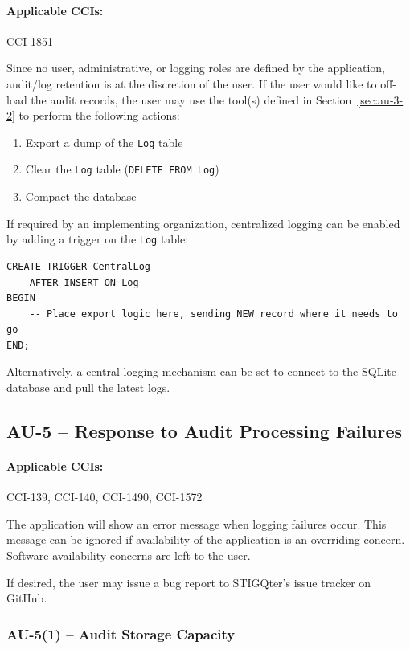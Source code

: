 \documentclass[letterpaper, 10pt, twoside]{article}
\begin{document}
\paragraph{Applicable CCIs:} CCI-1851

Since no user, administrative, or logging roles are defined by the application, audit/log retention is at the discretion of the user. If the user would like to off-load the audit records, the user may use the tool(s) defined in Section~\ref{sec:au-3-2} to perform the following actions:
\begin{enumerate}
	\item Export a dump of the \texttt{Log} table
	\item Clear the \texttt{Log} table (\texttt{DELETE FROM Log})
	\item Compact the database
\end{enumerate}

If required by an implementing organization, centralized logging can be enabled by adding a trigger on the \texttt{Log} table:

\begin{lstlisting}[style=SqlStyle]
CREATE TRIGGER CentralLog 
	AFTER INSERT ON Log
BEGIN
	-- Place export logic here, sending NEW record where it needs to go
END;
\end{lstlisting}

Alternatively, a central logging mechanism can be set to connect to the SQLite database and pull the latest logs.

\subsection{AU-5 -- Response to Audit Processing Failures}
\label{sec:au-5}

\paragraph{Applicable CCIs:} CCI-139, CCI-140, CCI-1490, CCI-1572

The application will show an error message when logging failures occur. This message can be ignored if availability of the application is an overriding concern. Software availability concerns are left to the user.

If desired, the user may issue a bug report to STIGQter's issue tracker on GitHub.

\subsubsection{AU-5(1) -- Audit Storage Capacity}
\end{document}
